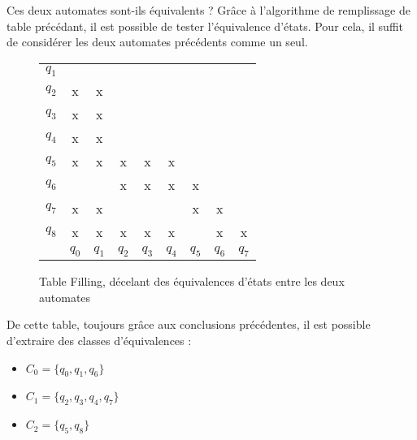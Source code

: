 Ces deux automates sont-ils équivalents ? Grâce à l'algorithme de remplissage de table précédant, il est possible de tester l'équivalence d'états. Pour cela, il suffit de considérer les deux automates précédents comme un seul.

\begin{figure}[H]
	\centering
	\begin{tabular}{ccccccccc}
		\cline{2-2}
		\multicolumn{1}{c|}{$q_1$}&\multicolumn{1}{c|}{} &&&&&&&\\
		\cline{2-3}
		\multicolumn{1}{c|}{$q_2$}&\multicolumn{1}{c|}{x} &\multicolumn{1}{c|}{x}&&&&&&\\
		\cline{2-4}
		\multicolumn{1}{c|}{$q_3$}&\multicolumn{1}{c|}{x}&\multicolumn{1}{c|}{x}&\multicolumn{1}{c|}{}&&&&&\\
		\cline{2-5}
		\multicolumn{1}{c|}{$q_4$}&\multicolumn{1}{c|}{x}&\multicolumn{1}{c|}{x}&\multicolumn{1}{c|}{}&\multicolumn{1}{c|}{}&&&&\\
		\cline{2-6}
		\multicolumn{1}{c|}{$q_5$}&\multicolumn{1}{c|}{x}&\multicolumn{1}{c|}{x}&\multicolumn{1}{c|}{x}&\multicolumn{1}{c|}{x}&\multicolumn{1}{c|}{x}&&&\\
		\cline{2-7}
		\multicolumn{1}{c|}{$q_6$}&\multicolumn{1}{c|}{}&\multicolumn{1}{c|}{}&\multicolumn{1}{c|}{x}&\multicolumn{1}{c|}{x}&\multicolumn{1}{c|}{x}&\multicolumn{1}{c|}{x}&&\\
		\cline{2-8}
		\multicolumn{1}{c|}{$q_7$}&\multicolumn{1}{c|}{x}&\multicolumn{1}{c|}{x}&\multicolumn{1}{c|}{}&\multicolumn{1}{c|}{}&\multicolumn{1}{c|}{}&\multicolumn{1}{c|}{x}&\multicolumn{1}{c|}{x}&\\
		\cline{2-9}
		\multicolumn{1}{c|}{$q_8$}&\multicolumn{1}{c|}{x}&\multicolumn{1}{c|}{x}&\multicolumn{1}{c|}{x}&\multicolumn{1}{c|}{x}&\multicolumn{1}{c|}{x}&\multicolumn{1}{c|}{}&\multicolumn{1}{c|}{x}&\multicolumn{1}{c|}{x}\\
		\cline{2-9}
		\multicolumn{1}{c}{} & $q_0$& $q_1$ & $q_2$ & $q_3$ & $q_4$ & $q_5$ & $q_6$ & $q_7$\\
		
	\end{tabular}
	\caption{Table Filling, décelant des équivalences d'états entre les deux automates}\label{fig:tahi}
\end{figure}

De cette table, toujours grâce aux conclusions précédentes, il est possible d'extraire des classes d'équivalences : 
\begin{itemize}
	\item $C_0 = \{q_0, q_1, q_6\}$
	\item $C_1 = \{q_2, q_3, q_4, q_7\}$
	\item $C_2 = \{q_5, q_8\}$
\end{itemize}

